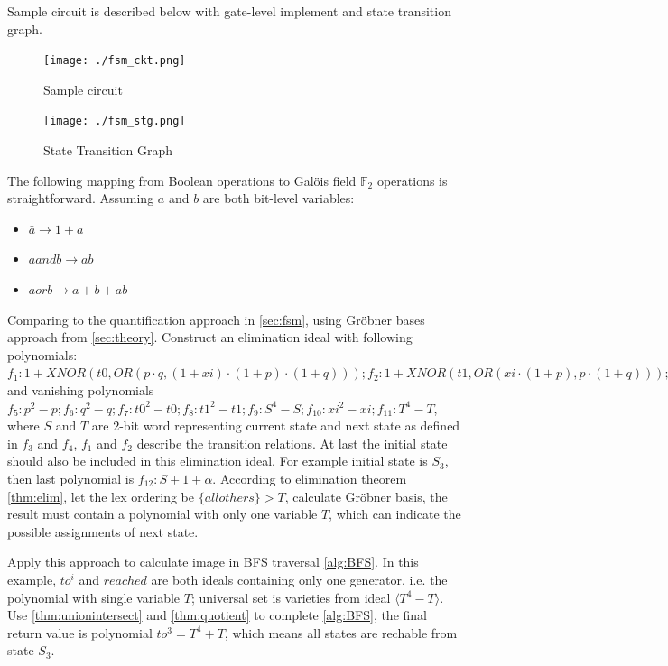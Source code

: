 \begin{Example}
\label{ex:traversal}
Sample circuit is described below with gate-level implement and state transition
graph.
  \begin{figure}[hbt]
    \centerline{\texttt{[image: ./fsm\_ckt.png]}}
    \caption{Sample circuit}
  \label{fig:fsmckt}
  \end{figure}

  \begin{figure}[hbt]
    \centerline{\texttt{[image: ./fsm\_stg.png]}}
    \caption{State Transition Graph}
  \label{fig:fsmstg}
  \end{figure}

The following mapping from Boolean operations to Gal\"ois field $\mathbb{F}_2$ 
operations is straightforward. Assuming $a$ and $b$ are both bit-level variables:
\begin{itemize}
  \item $\bar{a} \rightarrow 1 + a$
  \item $a and b \rightarrow ab$
  \item $a or b \rightarrow a + b + ab$
\end{itemize}
Comparing to the quantification approach in \ref{sec:fsm}, using Gr\"obner bases
approach from \ref{sec:theory}. Construct an elimination ideal with following 
polynomials: $f_1: 1 + XNOR(t0, OR(p\cdot q, (1+xi)\cdot(1+p)\cdot(1+q))); 
f_2: 1 + XNOR(t1, OR(xi\cdot(1+p),p\cdot(1+q))); f_3: S - p - q\cdot\alpha; 
f_4: T - t0 - t1\cdot\alpha$ and vanishing polynomials $f_5: p^2 - p; 
f_6: q^2 - q; f_7: t0^2 - t0; f_8: t1^2 - t1; f_9: S^4 - S; f_{10}: xi^2 - xi; 
f_{11}: T^4 - T$, where $S$ and $T$ are 2-bit word representing current state
and next state as defined in $f_3$ and $f_4$, $f_1$ and $f_2$ describe the 
transition relations. At last the initial state should also be included in 
this elimination ideal. For example initial state is $S_3$, then last polynomial
is $f_{12}: S + 1 + \alpha$. According to elimination theorem \ref{thm:elim},
let the lex ordering be $\{all others\} > T$, calculate Gr\"obner basis, the 
result must contain a polynomial with only one variable $T$, which can indicate
the possible assignments of next state. \par

Apply this approach to calculate image in BFS traversal \ref{alg:BFS}.
In this example, $to^i$ and $reached$ are both ideals containing only one
generator, i.e. the polynomial with single variable $T$; universal set is
varieties from ideal $\langle T^4 - T\rangle$. Use \ref{thm:unionintersect} and
\ref{thm:quotient} to complete \ref{alg:BFS}, the final return value is 
polynomial $to^3 = T^4 + T$, which means all states are rechable from state $S_3$.
\end{Example}

